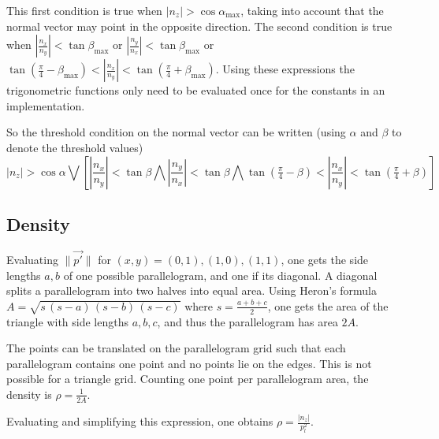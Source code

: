This first condition is true when $|n_z| > \cos \alpha_\text{max}$, taking into account that the normal vector may point in the opposite direction. The second condition is true when $|\frac{n_x}{n_y}| < \tan \beta_{\text{max}}$ or $|\frac{n_y}{n_x}| < \tan \beta_{\text{max}}$ or $\tan \left(\frac{\pi}{4} - \beta_{\text{max}}\right) < |\frac{n_x}{n_y}| < \tan \left(\frac{\pi}{4} + \beta_{\text{max}}\right)$. Using these expressions the trigonometric functions only need to be evaluated once for the constants in an implementation.

So the threshold condition on the normal vector can be written (using $\alpha$ and $\beta$ to denote the threshold values)
\begin{equation}
|n_z| > \cos \alpha \bigvee
\left[
\left|\frac{n_x}{n_y}\right| < \tan \beta
\bigwedge \left|\frac{n_y}{n_x}\right| < \tan \beta
\bigwedge \tan \left(\tfrac{\pi}{4} - \beta\right) < \left|\frac{n_x}{n_y}\right| < \tan \left(\tfrac{\pi}{4} + \beta \right)
\right]
\end{equation}


\subsection{Density}
Evaluating $\| \vec{p'} \|$ for $(x, y) = (0, 1), (1, 0), (1, 1)$, one gets the side lengths $a, b$ of one possible parallelogram, and one if its diagonal. A diagonal splits a parallelogram into two halves into equal area. Using Heron's formula $A = \sqrt{s \, (s - a) \, (s - b) \, (s - c)}$ where $s = \frac{a+b+c}{2}$, one gets the area of the triangle with side lengths $a, b, c$, and thus the parallelogram has area $2 A$.

The points can be translated on the parallelogram grid such that each parallelogram contains one point and no points lie on the edges. This is not possible for a triangle grid. Counting one point per parallelogram area, the density is $\rho = \frac{1}{2 A}$.

Evaluating and simplifying this expression, one obtains $\rho = \frac{| n_z |}{p^2_l}$.


